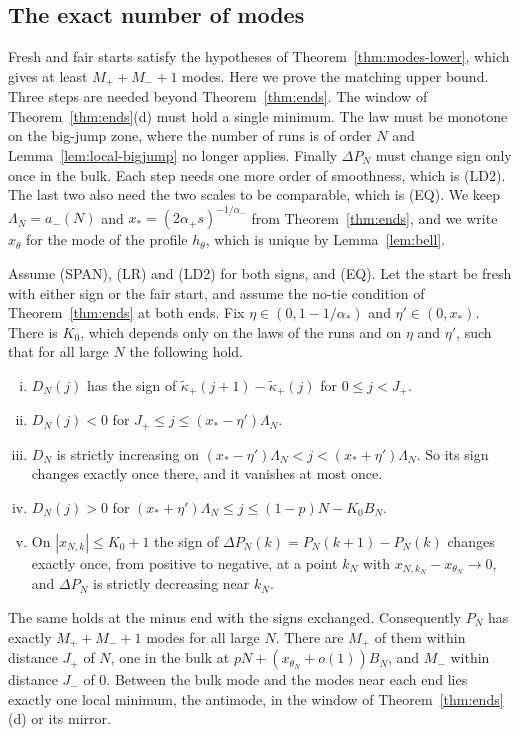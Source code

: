 \subsection{The exact number of modes}\label{sec:mode-count}

Fresh and fair starts satisfy the hypotheses of Theorem~\ref{thm:modes-lower}, which gives
at least $M_\plus+M_\minus+1$ modes. Here we prove the matching upper bound. Three steps are
needed beyond Theorem~\ref{thm:ends}. The window of Theorem~\ref{thm:ends}(d) must hold a
single minimum. The law must be monotone on the big-jump zone, where the number of runs is of
order $N$ and Lemma~\ref{lem:local-bigjump} no longer applies. Finally $\Delta P_N$ must change
sign only once in the bulk. Each step needs one more order of smoothness, which is (LD2). The
last two also need the two scales to be comparable, which is (EQ). We keep
$\Lambda_N=a_\minus(N)$ and $x_*=(2\alpha_\plus s)^{-1/\alpha_\minus}$ from
Theorem~\ref{thm:ends}, and we write $x_\theta$ for the mode of the profile $h_\theta$, which is
unique by Lemma~\ref{lem:bell}.

\begin{introtheorem}\label{thm:mode-count}
Assume (SPAN), (LR) and (LD2) for both signs, and (EQ). Let the start be fresh with either
sign or the fair start, and assume the no-tie condition of Theorem~\ref{thm:ends} at both
ends. Fix $\eta\in(0,1-1/\alpha_*)$ and $\eta'\in(0,x_*)$. There is $K_0$, which depends only on
the laws of the runs and on $\eta$ and $\eta'$, such that for all large $N$ the following hold.
\begin{enumerate}[(i)]
\item $D_N(j)$ has the sign of $\widetilde\kappa_\plus(j+1)-\widetilde\kappa_\plus(j)$ for
$0\le j<J_\plus$.
\item $D_N(j)<0$ for $J_\plus\le j\le(x_*-\eta')\Lambda_N$.
\item $D_N$ is strictly increasing on $(x_*-\eta')\Lambda_N<j<(x_*+\eta')\Lambda_N$. So its sign
changes exactly once there, and it vanishes at most once.
\item $D_N(j)>0$ for $(x_*+\eta')\Lambda_N\le j\le(1-p)N-K_0B_N$.
\item On $|x_{N,k}|\le K_0+1$ the sign of $\Delta P_N(k)=P_N(k+1)-P_N(k)$ changes exactly once,
from positive to negative, at a point $k_N$ with $x_{N,k_N}-x_{\theta_N}\to0$, and $\Delta P_N$
is strictly decreasing near $k_N$.
\end{enumerate}
The same holds at the minus end with the signs exchanged. Consequently $P_N$ has exactly
$M_\plus+M_\minus+1$ modes for all large $N$. There are $M_\plus$ of them within distance
$J_\plus$ of $N$, one in the bulk at $pN+(x_{\theta_N}+o(1))B_N$, and $M_\minus$ within distance
$J_\minus$ of $0$. Between the bulk mode and the modes near each end lies exactly one local
minimum, the antimode, in the window of Theorem~\ref{thm:ends}(d) or its mirror.
\end{introtheorem}


